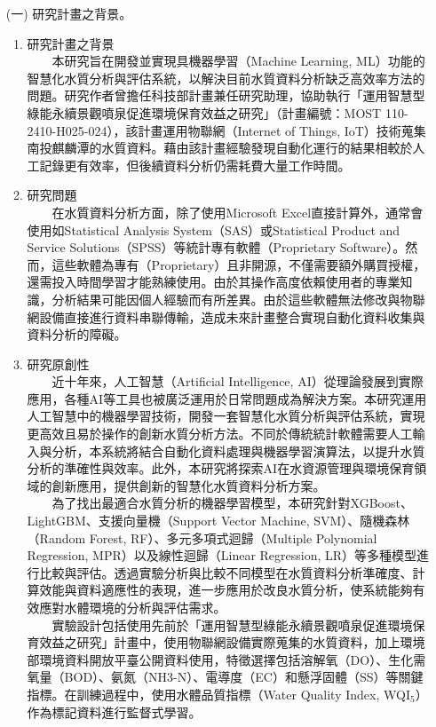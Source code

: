 \documentclass[12pt,a4paper]{article}
\begin{document}

\begin{enumerate}
\item[(一)] 研究計畫之背景。
\begin{enumerate}[label=\arabic*.]
\item 研究計畫之背景\\
　　本研究旨在開發並實現具機器學習（Machine Learning, ML）功能的智慧化水質分析與評估系統，以解決目前水質資料分析缺乏高效率方法的問題。研究作者曾擔任科技部計畫兼任研究助理，協助執行「運用智慧型綠能永續景觀噴泉促進環境保育效益之研究」（計畫編號：MOST 110-2410-H025-024），該計畫運用物聯網（Internet of Things, IoT）技術蒐集南投麒麟潭的水質資料。藉由該計畫經驗發現自動化運行的結果相較於人工記錄更有效率，但後續資料分析仍需耗費大量工作時間。
\item 研究問題\\
　　在水質資料分析方面，除了使用Microsoft Excel直接計算外，通常會使用如Statistical Analysis System（SAS）或Statistical Product and Service Solutions（SPSS）等統計專有軟體（Proprietary Software）。然而，這些軟體為專有（Proprietary）且非開源，不僅需要額外購買授權，還需投入時間學習才能熟練使用。由於其操作高度依賴使用者的專業知識，分析結果可能因個人經驗而有所差異。由於這些軟體無法修改與物聯網設備直接進行資料串聯傳輸，造成未來計畫整合實現自動化資料收集與資料分析的障礙。
\item 研究原創性\\
　　近十年來，人工智慧（Artificial Intelligence, AI）從理論發展到實際應用，各種AI等工具也被廣泛運用於日常問題成為解決方案\cite{ref1}。本研究運用人工智慧中的機器學習技術，開發一套智慧化水質分析與評估系統，實現更高效且易於操作的創新水質分析方法。不同於傳統統計軟體需要人工輸入與分析，本系統將結合自動化資料處理與機器學習演算法，以提升水質分析的準確性與效率。此外，本研究將探索AI在水資源管理與環境保育領域的創新應用，提供創新的智慧化水質資料分析方案。\\  
　　為了找出最適合水質分析的機器學習模型，本研究針對XGBoost、LightGBM、支援向量機（Support Vector Machine, SVM）、隨機森林（Random Forest, RF）、多元多項式迴歸（Multiple Polynomial Regression, MPR）以及線性迴歸（Linear Regression, LR）等多種模型進行比較與評估。透過實驗分析與比較不同模型在水質資料分析準確度、計算效能與資料適應性的表現，進一步應用於改良水質分析，使系統能夠有效應對水體環境的分析與評估需求。\\
　　實驗設計包括使用先前於「運用智慧型綠能永續景觀噴泉促進環境保育效益之研究」計畫中，使用物聯網設備實際蒐集的水質資料，加上環境部環境資料開放平臺公開資料使用，特徵選擇包括溶解氧（DO）、生化需氧量（BOD）、氨氮（NH3-N）、電導度（EC）和懸浮固體（SS）等關鍵指標。在訓練過程中，使用水體品質指標（Water Quality Index, WQI$_5$）作為標記資料進行監督式學習。

\end{enumerate}
\end{enumerate}
\end{document}
